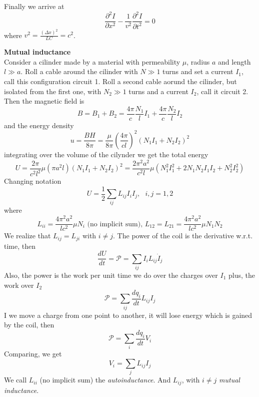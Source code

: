 \documentclass[12pt,a4paper]{article}
\newcommand{\dt}[1]{\frac{d #1}{dt}} %
\begin{document}
Finally we arrive at
\begin{equation}
	\frac{\partial^2 I}{\partial x^2} - \frac{1}{v^2}\frac{\partial^2 I}{\partial t^2} = 0
\end{equation}
where $v^2 = \frac{(\Delta x)^2}{LC} = c^2$.

\textbf{Mutual inductance}\\
Consider a cilinder made by a material with permeability $\mu$, radius $a$ and length $l\gg a$. Roll a cable around the cilinder with $N\gg 1$ turns and set a current $I_1$, call this configuration circuit 1. Roll a second cable aorund the cilinder, but isolated from the first one, with $N_2 \gg 1$ turns and a current $I_2$, call it circuit 2. Then the magnetic field is
\begin{equation}
	B = B_1 + B_2 = \frac{4\pi}{c}\frac{N_1}{l}I_1 + \frac{4\pi}{c}\frac{N_2}{l}I_2
\end{equation}
and the energy density
\begin{equation}
	u = \frac{BH}{8\pi} = \frac{\mu}{8\pi}\left(\frac{4\pi}{cl} \right)^2 (N_1 I_1 + N_2 I_2)^2
\end{equation}
integrating over the volume of the cilynder we get the total energy
\begin{equation}  
	U = \frac{2\pi}{c^2 l^2}\mu (\pi a^2 l)(N_1 I_1 + N_2 I_2)^2 = \frac{2\pi^2 a^2}{c^2 l}\mu (N_1^2 I^2_1 + 2N_1N_2 I_1 I_2 + N_2^2 I_2^2)
\end{equation}
Changing notation
\begin{equation}
	U = \frac{1}{2} \sum_{ij}L_{ij}I_iI_j,\ \ \ i,j =1,2
\end{equation}
where
\begin{equation}
	L_{ii} =  \frac{4\pi^2 a^2}{lc^2}\mu N_i \text{  (no implicit sum), } L_{12} = L_{21} =  \frac{4\pi^2 a^2}{lc^2}\mu N_1N_2
\end{equation}
We realize that $L_{ij} = L_{ji}$ with $i\ne j$. The power of the coil is the derivative w.r.t. time, then
\begin{equation}
	\dt{U} = \mathcal{P} = \sum_{ij}I_i L_{ij}\dot{I}_j
\end{equation}
Also, the power is the work per unit time we do over the charges over $I_1$ plus, the work over $I_2$
\begin{equation}
	\mathcal{P} = \sum_{ij}\dt{q_i} L_{ij} I_j
\end{equation}
I we move a charge from one point to another, it will lose energy which is gained by the coil, then
\begin{equation}
	\mathcal{P} = \sum_i \dt{q_i} V_i
\end{equation} 
Comparing, we get
\begin{equation}
	V_i = \sum_{j} L_{ij}I_j
\end{equation}
We call $L_{ii}$ (no implicit sum) the \textit{autoinductance}. And $L_{ij}$, with $i\neq j$ \textit{mutual inductance}.
\end{document}

